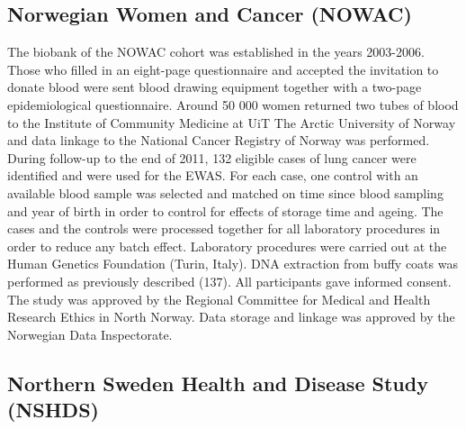 \documentclass[11pt,twoside]{bristolthesis}
\begin{document}
\hypertarget{nowac}{%
\subsection{Norwegian Women and Cancer (NOWAC)}\label{nowac}}

The biobank of the NOWAC cohort was established in the years 2003-2006. Those who filled in an eight-page questionnaire and accepted the invitation to donate blood were sent blood drawing equipment together with a two-page epidemiological questionnaire. Around 50 000 women returned two tubes of blood to the Institute of Community Medicine at UiT The Arctic University of Norway and data linkage to the National Cancer Registry of Norway was performed. During follow-up to the end of 2011, 132 eligible cases of lung cancer were identified and were used for the EWAS. For each case, one control with an available blood sample was selected and matched on time since blood sampling and year of birth in order to control for effects of storage time and ageing. The cases and the controls were processed together for all laboratory procedures in order to reduce any batch effect. Laboratory procedures were carried out at the Human Genetics Foundation (Turin, Italy). DNA extraction from buffy coats was performed as previously described (137). All participants gave informed consent. The study was approved by the Regional Committee for Medical and Health Research Ethics in North Norway. Data storage and linkage was approved by the Norwegian Data Inspectorate.

\hypertarget{nshds}{%
\subsection{Northern Sweden Health and Disease Study (NSHDS)}\label{nshds}}
\end{document}
